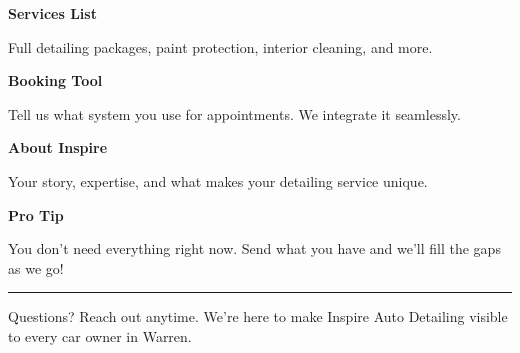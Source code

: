\documentclass[11pt,letterpaper]{article}
\begin{document}
\hfill
\begin{minipage}[t]{0.48\textwidth}
\begin{tcolorbox}[colframe=accent-teal, boxrule=1pt, left=0.7em, right=0.7em, top=0.5em, bottom=0.5em, arc=4pt, boxsep=0pt]
{\bfseries\small\color{accent-teal}Services List}

\vspace{0.15em}

{\small Full detailing packages, paint protection, interior cleaning, and more.}
\end{tcolorbox}

\vspace{0.1em}

\begin{tcolorbox}[colframe=accent-teal, boxrule=1pt, left=0.7em, right=0.7em, top=0.5em, bottom=0.5em, arc=4pt, boxsep=0pt]
{\bfseries\small\color{accent-teal}Booking Tool}

\vspace{0.15em}

{\small Tell us what system you use for appointments. We integrate it seamlessly.}
\end{tcolorbox}

\vspace{0.1em}

\begin{tcolorbox}[colframe=accent-teal, boxrule=1pt, left=0.7em, right=0.7em, top=0.5em, bottom=0.5em, arc=4pt, boxsep=0pt]
{\bfseries\small\color{accent-teal}About Inspire}

\vspace{0.15em}

{\small Your story, expertise, and what makes your detailing service unique.}
\end{tcolorbox}

\vspace{-0.2em}
\end{minipage}

\vspace{0.15em}

\begin{tcolorbox}[colback={accent-red!5}, colframe=accent-red!20, boxrule=0.5pt, left=0.7em, right=0.7em, top=0.4em, bottom=0.4em, arc=6pt, boxsep=0pt]

{\bfseries\small\color{accent-red}Pro Tip}

\vspace{0.1em}

{\small You don't need everything right now. Send what you have and we'll fill the gaps as we go!}

\end{tcolorbox}

\vspace{0.15em}

\noindent\hrule
\vspace{0.2em}

{\small\color{text-light}Questions? Reach out anytime. We're here to make Inspire Auto Detailing visible to every car owner in Warren.}
\end{document}
